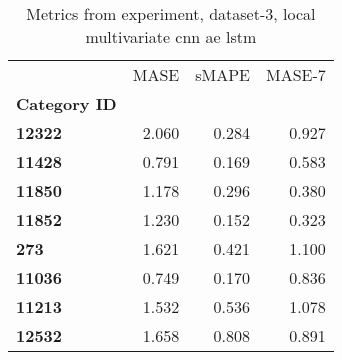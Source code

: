 \begin{table}[h]
\centering
\caption{Metrics from experiment, dataset-3, local multivariate cnn ae lstm}
\label{table:local-multivariate-cnn-ae-lstm-dataset-3}
\begin{tabular}{lrrr}
\toprule
{} &   MASE &  sMAPE &  MASE-7 \\
\textbf{Category ID} &        &        &         \\
\midrule
\textbf{12322      } &  2.060 &  0.284 &   0.927 \\
\textbf{11428      } &  0.791 &  0.169 &   0.583 \\
\textbf{11850      } &  1.178 &  0.296 &   0.380 \\
\textbf{11852      } &  1.230 &  0.152 &   0.323 \\
\textbf{273        } &  1.621 &  0.421 &   1.100 \\
\textbf{11036      } &  0.749 &  0.170 &   0.836 \\
\textbf{11213      } &  1.532 &  0.536 &   1.078 \\
\textbf{12532      } &  1.658 &  0.808 &   0.891 \\
\bottomrule
\end{tabular}
\end{table}
